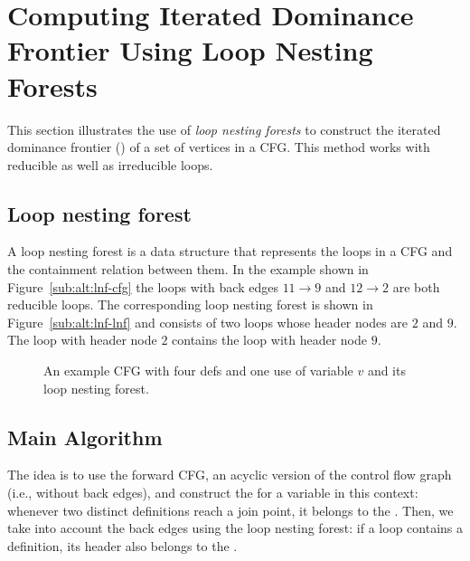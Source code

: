 {\begin{algorithm}
\end{algorithm}

\section{Computing Iterated Dominance Frontier Using Loop Nesting Forests}
\label{section:alternative_ssa_construction_algorithms:loop}
This section illustrates the use of \emph{loop nesting forests} to construct the iterated dominance frontier (\iDF) of a set of vertices in a CFG. 
This method works with reducible as well as irreducible loops.


\subsection{Loop nesting forest}%
\label{sec:loop_nesting_forest}A loop nesting forest is a data structure that represents the loops in a CFG and the containment relation between them. 
In the example shown in Figure~\ref{sub:alt:lnf-cfg} the loops with back edges $11 \rightarrow 9$ and $12 \rightarrow 2$ are both reducible loops. 
The corresponding loop nesting forest is shown in Figure~\ref{sub:alt:lnf-lnf} and consists of two loops whose header nodes are $2$ and $9$. 
The loop with header node $2$ contains the loop with header node $9$.

\begin{figure}[t]     \hfill     {}     \hfill     {}     \hfill\null     \caption{An example CFG with four defs and one use of variable $v$ and its loop nesting forest.}
\label{fig:lnf} \end{figure} 

\subsection{Main Algorithm}
The idea is to use the forward CFG, an acyclic version of the control flow graph (i.e., without back edges), and construct the \iDF for a variable in this context:  whenever two distinct definitions reach a join point, it belongs to the \iDF. 
Then, we take into account the back edges using the loop nesting forest:  if a loop contains a definition, its header also belongs to the \iDF.

}
